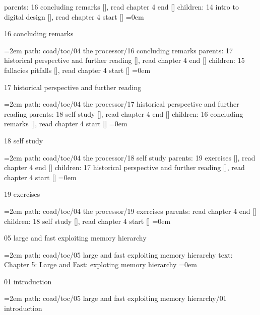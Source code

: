 \smallskip
parents:  16 concluding remarks [], read chapter 4 end []
\smallskip
children: 14 intro to digital design [], read chapter 4 start []
\smallskip
\leftskip=0em
\par\endgroup
\bigskip
{}
16 concluding remarks
\smallskip
\par\begingroup
\leftskip=2em
path: coad/toc/04 the processor/16 concluding remarks
\smallskip
parents:  17 historical perspective and further reading [], read chapter 4 end []
\smallskip
children: 15 fallacies pitfalls [], read chapter 4 start []
\smallskip
\leftskip=0em
\par\endgroup
\bigskip
{}
17 historical perspective and further reading
\smallskip
\par\begingroup
\leftskip=2em
path: coad/toc/04 the processor/17 historical perspective and further reading
\smallskip
parents:  18 self study [], read chapter 4 end []
\smallskip
children: 16 concluding remarks [], read chapter 4 start []
\smallskip
\leftskip=0em
\par\endgroup
\bigskip
{}
18 self study
\smallskip
\par\begingroup
\leftskip=2em
path: coad/toc/04 the processor/18 self study
\smallskip
parents:  19 exercises [], read chapter 4 end []
\smallskip
children: 17 historical perspective and further reading [], read chapter 4 start []
\smallskip
\leftskip=0em
\par\endgroup
\bigskip
{}
19 exercises
\smallskip
\par\begingroup
\leftskip=2em
path: coad/toc/04 the processor/19 exercises
\smallskip
parents:  read chapter 4 end []
\smallskip
children: 18 self study [], read chapter 4 start []
\smallskip
\leftskip=0em
\par\endgroup
\bigskip
{}
05 large and fast exploiting memory hierarchy
\smallskip
\par\begingroup
\leftskip=2em
path: coad/toc/05 large and fast exploiting memory hierarchy
\smallskip
text:  Chapter 5: Large and Fast: exploting memory hierarchy
\smallskip
\leftskip=0em
\par\endgroup
\bigskip
{}
01 introduction
\smallskip
\par\begingroup
\leftskip=2em
path: coad/toc/05 large and fast exploiting memory hierarchy/01 introduction
\smallskip
